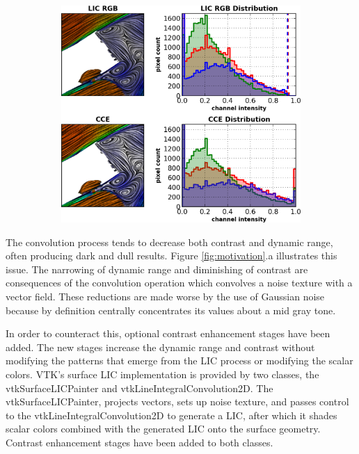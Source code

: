 \documentclass[a4paper,10pt]{article}
\begin{document}
\begin{figure}[h!]
\begin{subfigure}{0.48\textwidth}
\caption{}
\label{fig:gray-ce-curves2}
\end{subfigure}
\begin{subfigure}{0.48\textwidth}
\centering
\includegraphics[width=\textwidth]{./images-data/dia-serial/color-ce-curves.png}
\caption{}
\label{fig:gray-ce-curves2}
\end{subfigure}
\caption{}
\end{figure}

The convolution process tends to decrease both contrast and dynamic range, often producing dark and dull results. Figure \ref{fig:motivation}.a illustrates this issue. The narrowing of dynamic range and diminishing of contrast are consequences of the convolution operation which convolves a noise texture with a vector field. These reductions are made worse by the use of  Gaussian noise because by definition centrally concentrates its values about a mid gray tone.

In order to counteract this, optional contrast enhancement stages have been added. The new stages increase the dynamic range and contrast without modifying the patterns that emerge from the LIC process or modifying the scalar colors. VTK's surface LIC implementation is provided by two classes, the vtkSurfaceLICPainter and vtkLineIntegralConvolution2D. The vtkSurfaceLICPainter, projects vectors, sets up noise texture, and passes control to the vtkLineIntegralConvolution2D to generate a LIC, after which it shades scalar colors combined with the generated LIC onto the surface geometry. Contrast enhancement stages have been added to both classes.
\end{document}

